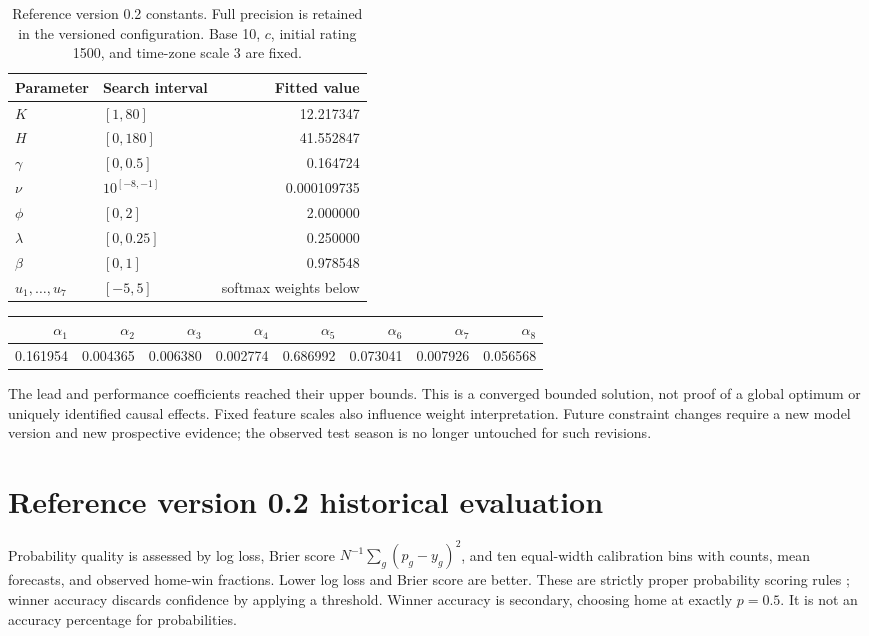 \documentclass[11pt]{article}
\begin{document}
\begin{table}[ht]
\centering\small
\begin{tabular}{llr}
\toprule
Parameter & Search interval & Fitted value\\
\midrule
$K$ & $[1,80]$ & 12.217347\\
$H$ & $[0,180]$ & 41.552847\\
$\gamma$ & $[0,0.5]$ & 0.164724\\
$\nu$ & $10^{[-8,-1]}$ & 0.000109735\\
$\phi$ & $[0,2]$ & 2.000000\\
$\lambda$ & $[0,0.25]$ & 0.250000\\
$\beta$ & $[0,1]$ & 0.978548\\
$u_1,\ldots,u_7$ & $[-5,5]$ & softmax weights below\\
\bottomrule
\end{tabular}
\caption{Reference version 0.2 constants. Full precision is retained in the versioned
configuration. Base 10, $c$, initial rating 1500, and time-zone scale 3 are fixed.}
\end{table}

\begin{center}
\begin{tabular}{rrrrrrrr}
\toprule
$\alpha_1$&$\alpha_2$&$\alpha_3$&$\alpha_4$&$\alpha_5$&$\alpha_6$&$\alpha_7$&$\alpha_8$\\
\midrule
0.161954&0.004365&0.006380&0.002774&0.686992&0.073041&0.007926&0.056568\\
\bottomrule
\end{tabular}
\end{center}
The lead and performance coefficients reached their upper bounds. This is a
converged bounded solution, not proof of a global optimum or uniquely identified
causal effects. Fixed feature scales also influence weight interpretation.
Future constraint changes require a new model version and new prospective
evidence; the observed test season is no longer untouched for such revisions.

\section{Reference version 0.2 historical evaluation}
Probability quality is assessed by log loss, Brier score
$N^{-1}\sum_g(p_g-y_g)^2$, and ten equal-width calibration bins with counts,
mean forecasts, and observed home-win fractions. Lower log loss and Brier
score are better. These are strictly proper probability scoring rules
\cite{scoring}; winner accuracy discards confidence by applying a threshold.
Winner accuracy is secondary, choosing home at exactly
$p=0.5$. It is not an accuracy percentage for probabilities.
\end{document}
